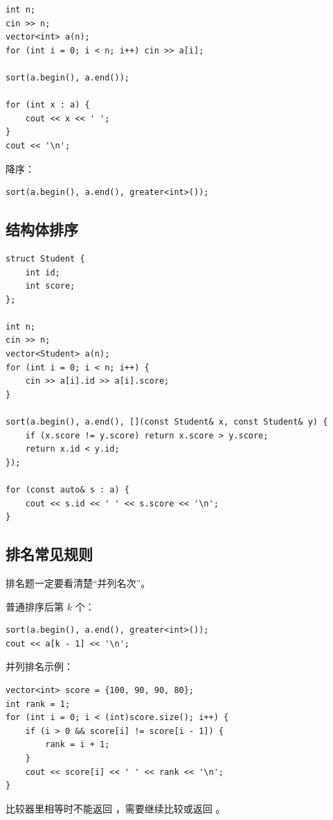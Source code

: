 \begin{lstlisting}
int n;
cin >> n;
vector<int> a(n);
for (int i = 0; i < n; i++) cin >> a[i];

sort(a.begin(), a.end());

for (int x : a) {
    cout << x << ' ';
}
cout << '\n';
\end{lstlisting}

降序：

\begin{lstlisting}
sort(a.begin(), a.end(), greater<int>());
\end{lstlisting}

\subsection{结构体排序}

\begin{lstlisting}
struct Student {
    int id;
    int score;
};

int n;
cin >> n;
vector<Student> a(n);
for (int i = 0; i < n; i++) {
    cin >> a[i].id >> a[i].score;
}

sort(a.begin(), a.end(), [](const Student& x, const Student& y) {
    if (x.score != y.score) return x.score > y.score;
    return x.id < y.id;
});

for (const auto& s : a) {
    cout << s.id << ' ' << s.score << '\n';
}
\end{lstlisting}

\subsection{排名常见规则}

排名题一定要看清楚“并列名次”。

普通排序后第 $k$ 个：

\begin{lstlisting}
sort(a.begin(), a.end(), greater<int>());
cout << a[k - 1] << '\n';
\end{lstlisting}

并列排名示例：

\begin{lstlisting}
vector<int> score = {100, 90, 90, 80};
int rank = 1;
for (int i = 0; i < (int)score.size(); i++) {
    if (i > 0 && score[i] != score[i - 1]) {
        rank = i + 1;
    }
    cout << score[i] << ' ' << rank << '\n';
}
\end{lstlisting}

比较器里相等时不能返回 ，需要继续比较或返回 。

